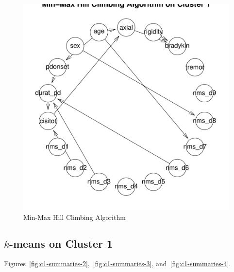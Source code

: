 \documentclass[letterpaper,12pt]{article}
\begin{document}
\begin{figure}[h]
  \centering
  \includegraphics[width=\linewidth]{clus1-bnet-mmhc.pdf}
  \caption{Min-Max Hill Climbing Algorithm}
  \label{fig:bnet-mmhc}
\end{figure}

\subsection{$k$-means on Cluster 1}

Figures~\ref{fig:c1-summaries-2},~\ref{fig:c1-summaries-3},
and~\ref{fig:c1-summaries-4}.
\end{document}
